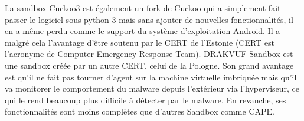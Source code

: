 La sandbox Cuckoo3 est également un fork de Cuckoo qui a simplement fait passer le logiciel sous python 3 mais sans ajouter de nouvelles fonctionnalités, il en a même perdu comme le support du système d'exploitation Android. Il a malgré cela l'avantage d'être soutenu par le CERT de l'Estonie (CERT est l'acronyme de Computer Emergency Response Team). DRAKVUF Sandbox est une sandbox créée par un autre CERT, celui de la Pologne. Son grand avantage est qu'il ne fait pas tourner d'agent sur la machine virtuelle imbriquée mais qu'il va monitorer le comportement du malware depuis l'extérieur via l'hyperviseur, ce qui le rend beaucoup plus difficile à détecter par le malware. En revanche, ses fonctionnalités sont moins complètes que d'autres Sandbox comme CAPE.

\newpage

